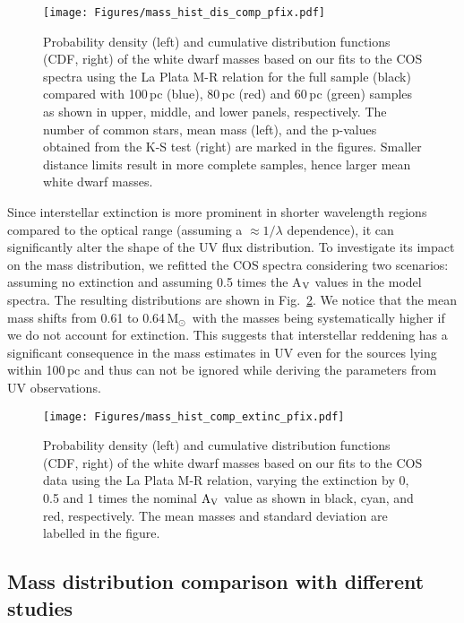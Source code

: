 \documentclass[fleqn,usenatbib, useAMS]{mnras}
\newcommand{\Msun}{\mbox{$\mathrm{M_\odot}$}}
\begin{document}
\begin{figure}
\centering
\texttt{[image: Figures/mass\_hist\_dis\_comp\_pfix.pdf]}
\caption{Probability density (left) and cumulative distribution functions (CDF, right) of the white dwarf masses based on our fits to the COS spectra using the La Plata M-R relation for the full sample (black) compared with 100\,pc (blue), 80\,pc (red) and 60\,pc (green) samples as shown in upper, middle, and lower panels, respectively. The number of common stars, mean mass (left), and the p-values obtained from the K-S test (right) are marked in the figures. Smaller distance limits result in more complete samples, hence larger mean white dwarf masses.} 
\label{fig:mass_wd_dist}
\end{figure}

Since interstellar extinction is more prominent in shorter wavelength regions compared to the optical range (assuming a $\approx 1/\lambda$ dependence), it can significantly alter the shape of the UV flux distribution. To investigate its impact on the mass distribution, we refitted the COS spectra considering two scenarios: assuming no extinction and assuming 0.5 times the A$\rm{_V}$ values in the model spectra. The resulting distributions are shown in Fig.~\ref{fig:mass_wd_av}. We notice that the mean mass shifts from 0.61 to 0.64\,\Msun\ with the masses being systematically higher if we do not account for extinction. 
This suggests that interstellar reddening has a significant consequence in the mass estimates in UV even for the sources lying within 100\,pc and thus can not be ignored while deriving the parameters from UV observations. 

\begin{figure}
\centering
\texttt{[image: Figures/mass\_hist\_comp\_extinc\_pfix.pdf]}
\caption{Probability density (left) and cumulative distribution functions (CDF, right) of the white dwarf masses based on our fits to the COS data using the La Plata M-R relation, varying the extinction by 0, 0.5 and 1 times the nominal $\rm{A_{V}}$ value as shown in black, cyan, and red, respectively. The mean masses and standard deviation are labelled in the figure.} 
\label{fig:mass_wd_av}
\end{figure}

\subsection{Mass distribution comparison with different studies}
\end{document}
